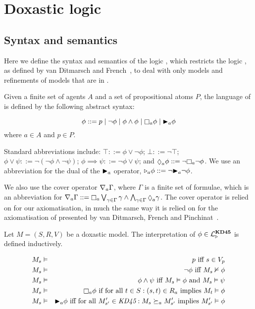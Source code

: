 \chapter{Doxastic logic}

\section{Syntax and semantics}

Here we define the syntax and semantics of the logic \logicKDF{}, which
restricts the logic \logicK{}, as defined by van Ditmarsch and
French~\cite{french2009simulation}, to deal with only models and refinements of
models that are in \classKD{}.

\begin{definition}
Given a finite set of agents $A$ and a set of propositional atoms $P$, the
language of \langF{} is defined by the following abstract syntax:

$$
\phi ::=    p \bnfalt
            \neg \phi \bnfalt
            \phi \land \phi \bnfalt
            \knows_a \phi \bnfalt
            \allrefs_a \phi
$$
where $a \in A$ and $p \in P$.
\end{definition}

Standard abbreviations include:
$\top ::= \phi \lor \neg \phi$;
$\bot ::= \neg \top$;
$\phi \lor \psi ::= \neg (\neg \phi \land \neg \psi)$;
$\phi \implies \psi ::= \neg \phi \lor \psi$;
and $\suspects_a \phi ::= \neg \knows_a \neg \phi$.
We use an abbreviation for the dual of the ${\mathopen{\blacktriangleright}}_a$ operator,
${\mathopen{\triangleright}}_a \phi ::= \neg {\ensuremath{\mathopen{\blacktriangleright}}}_a \neg \phi$.

We also use the cover operator $\nabla_a \Gamma$, where $\Gamma$ is a finite
set of formulae, which is an abbreviation for 
$\covers_a \Gamma ::= \knows_a \bigvee_{\gamma \in \Gamma} \gamma \land
\bigwedge_{\gamma \in \Gamma} \suspects_a \gamma$. The cover operator is relied
on for our axiomatisation, in much the same way it is relied on for the
axiomatisation of \logicKiF{} presented by van Ditmarsch, French and
Pinchinat~\cite{french2010future}.

\begin{definition}
Let $M = (S, R, V)$ be a doxastic model. The interpretation of $\phi \in
\mathcal{L}^{\mathbf{KD45}}_{\mathopen{\triangleright}}$ is defined inductively.

\begin{eqnarray*}
M_s &\entails& p \text{ iff } s \in V_p\\
M_s &\entails& \neg \phi \text{ iff } M_s \nentails \phi\\
M_s &\entails& \phi \land \psi \text{ iff } M_s \entails \phi \text{ and } M_s
\entails \psi\\
M_s &\entails& \knows_a \phi \text{ if for all } t \in S : (s, t) \in R_a \text{
implies } M_t \entails \phi\\
M_s &\entails& \allrefs_a \phi \text{ iff for all } M'_{s'} \in \classKD : M_s
\simulation_a M'_{s'} \text{ implies } M'_{s'} \entails \phi\\
\end{eqnarray*}
\end{definition}


